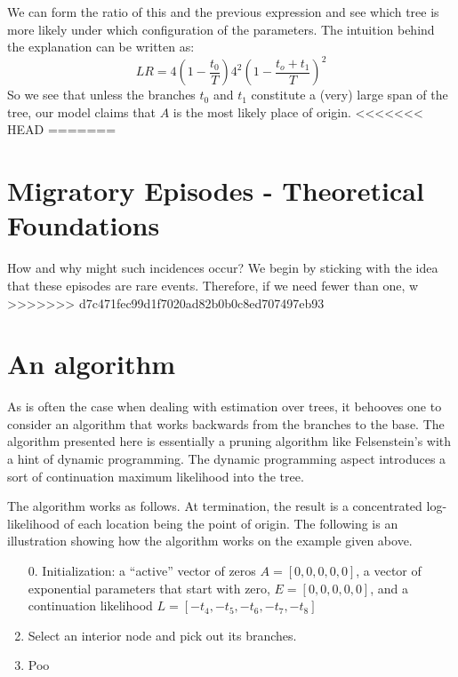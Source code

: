 \documentclass[11pt]{article}
\begin{document}
 We can form the ratio of this and the previous expression and see which tree is more likely under which configuration of the parameters. The intuition behind the explanation can be written as:
 \begin{equation*}
 LR = 4\left({1-\frac{t_0}{T}}\right)4^2\left(1-\frac{t_o+t_1}{T}\right)^2
 \end{equation*}
So we see that unless the branches $t_0$ and $t_1$ constitute a (very) large span of the tree, our model claims that $A$ is the most likely place of origin.
<<<<<<< HEAD
=======

\section{Migratory Episodes - Theoretical Foundations}

How and why might such incidences occur? We begin by sticking with the idea that these episodes are rare events. Therefore, if we need fewer than one, w
>>>>>>> d7c471fec99d1f7020ad82b0b0c8ed707497eb93

\section{An algorithm}

As is often the case when dealing with estimation over trees, it behooves one to consider an algorithm that works backwards from the branches to the base. The algorithm presented here is essentially a pruning algorithm like Felsenstein's with a hint of dynamic programming. The dynamic programming aspect introduces a sort of continuation maximum likelihood into the tree.

The algorithm works as follows. At termination, the result is a concentrated log-likelihood of each location being the point of origin.  The following is an illustration showing how the algorithm works on the example given above.

\begin{enumerate}
\item[0.] Initialization: a ``active'' vector of zeros $A=[0,0,0,0,0]$, a vector of exponential parameters that start with zero, $E=[0,0,0,0,0]$, and a continuation likelihood $L=[-t_4,-t_5,-t_6,-t_7,-t_8]$
\item  Select an interior node and pick out its branches.
\item  Poo
\end{enumerate}
\end{document}
